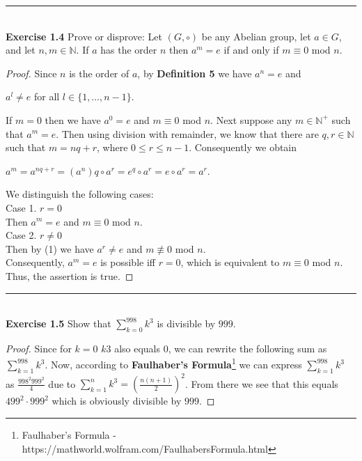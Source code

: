 \documentclass[a4paper]{article}
\begin{document}
\noindent\rule{12cm}{0.4pt}\\
\noindent \textbf{Exercise 1.4} Prove or disprove: Let $(G, \circ)$ be any Abelian group, let $a \in G$, and let $n, m \in \mathbb{N}$. If $a$ has the order $n$ then $a^m=e$ if and only if $m \equiv 0$ mod $n$.
\begin{proof}
Since $n$ is the order of $a$, by \textbf{Definition 5} we have $a^{n} = e$ and
\begin{center}
$a^{l} \neq e$ for all $l \in \{1, \ldots, n-1 \}$.
\end{center}
If $m=0$ then we have $a^{0}=e$ and $m\equiv 0$ mod $n$. Next suppose any $m \in \mathbb{N}^{+}$ such that $a^{m} = e$. Then using division with remainder, we know that there are $q,r \in \mathbb{N}$ such that $m = nq +r$, where $0 \leq r \leq n-1$. Consequently we obtain
\begin{center}
$a^{m} = a^{nq+r} = (a^{n})q \circ a^{r} = e^{q} \circ a^{r} = e \circ a^{r} = a^{r}$.
\end{center}
We distinguish the following cases:\\
Case 1. $r=0$\\
Then $a^{m} =e$ and $m \equiv 0$ mod $n$.\\
Case 2. $r \neq 0$\\
Then by (1) we have $a^{r} \neq e$ and $m \not\equiv 0$ mod $n$.\\
Consequently, $a^{m} = e$ is possible iff $r=0$, which is equivalent to $m \equiv 0$ mod $n$. Thus, the assertion is true.
\end{proof}



\noindent\rule{12cm}{0.4pt}\\
\noindent \textbf{Exercise 1.5} Show that $\sum_{k=0}^{998} k^3$ is divisible by $999$.
\begin{proof}
Since for $k=0$ $k3$ also equals $0$, we can rewrite the following sum as $\sum_{k=1}^{998} k^3$. Now, according to \textbf{Faulhaber's Formula}\footnote{Faulhaber's Formula - https://mathworld.wolfram.com/FaulhabersFormula.html} we can express $\sum_{k=1}^{998} k^3$ as $\frac{998^2 999^2}{4}$ due to $\sum_{k=1}^{n} k^3=\left( \frac{n(n+1)}{2}\right)^2$. From there we see that this equals $499^2 \cdot 999^2$ which is obviously divisible by $999$.
\end{proof}
\end{document}
